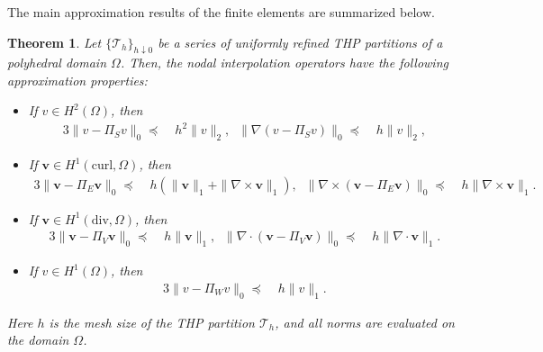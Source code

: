 \documentclass[twoside,reqno,final]{amsart}
\newtheorem{theorem}{Theorem}
\renewcommand{\b}[1]{{\boldsymbol{#1}}}
\newcommand{\curls}{{{\nabla\times}}}
\newcommand{\divs}{{\nabla\cdot}}
\newcommand{\grads}{{\nabla}}
\begin{document}
The main approximation results of the finite elements are summarized below.
\begin{theorem}
 \label{thm:approx}
  Let $\{\mathcal{T}_h\}_{h\downarrow 0}$ be a series of uniformly refined {\sf THP} partitions of a polyhedral domain $\Omega$.
  Then, the nodal interpolation operators have the following approximation properties:
\begin{itemize}
 \item [(1)]
If $v\in H^2(\Omega)$,
then
\begin{alignat*}{3}
 \|v-\varPi_S v\|_0\preceq &\; h^2\|v\|_2,\;\;
  \|\grads(v-\varPi_S v)\|_0\preceq &\; h\|v\|_2,
\end{alignat*}
 \item [(2)]
If $\b v\in H^1(\mathrm{curl},\Omega)$, then 
\begin{alignat*}{3}
 \|\b v-\b\varPi_E \b v\|_0\preceq &\; h
 (\|\b v\|_1+\|\curls \b v\|_1), \;\; 
 \|\curls(\b v-\b\varPi_E \b v)\|_0\preceq &\; h
 \|\curls \b v\|_1.
\end{alignat*}
 \item [(3)]
If $\b v\in H^1(\mathrm{div},\Omega)$, then
\begin{alignat*}{3}
 \|\b v-\b\varPi_V \b v\|_0
\preceq &\; h
\|\b v\|_1, \;\;
 \|\divs(\b v-\b\varPi_V \b v)\|_0
\preceq &\; h
\|\divs\b v\|_1.
\end{alignat*}
 \item [(4)]
If $v\in H^1(\Omega)$, then
\begin{alignat*}{3}
 \|v-\varPi_W v\|_0
\preceq &\; h\|v\|_1.
\end{alignat*}
\end{itemize}
Here $h$ is the mesh size of the {\sf THP} partition $\mathcal{T}_h$, and 
all norms are evaluated on the domain $\Omega$.
\end{theorem}
\end{document}
